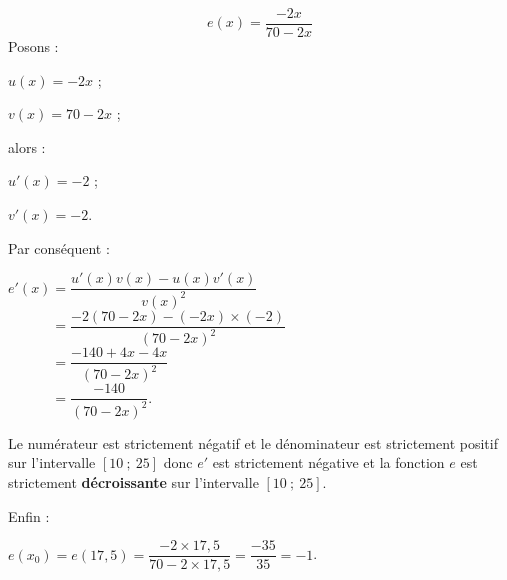 \begin{corrige}
\begin{enumerate}
          \[ e(x)=\dfrac{-2x}{70-2x} \]
          Posons :
          \par
          $u(x)=-2x$ ;
          \par
          $v(x)=70-2x$ ;
          \par
          alors :
          \par
          $u'(x)=-2$ ;
          \par
          $v'(x)=-2$.
          \par
          Par conséquent :
          \par
          $e'(x)= \dfrac{u'(x)v(x)-u(x)v'(x)}{v(x)^2}$\\
          $\phantom{e'(x)}=\dfrac{-2(70-2x)-(-2x) \times (-2)}{(70-2x)^2}$\\
          $\phantom{e'(x)}= \dfrac{-140+4x-4x}{(70-2x)^2}$\\
          $\phantom{e'(x)}= \dfrac{-140}{(70-2x)^2}.$
          \par
          Le numérateur est strictement négatif et le dénominateur est strictement positif sur l'intervalle $[10~;~25]$ donc $e'$ est strictement négative et la fonction $e$ est strictement \textbf{décroissante} sur l'intervalle $[10~;~25]$.
          \par
          Enfin :
          \par
          $e(x_0)=e(17,5)=\dfrac{-2 \times 17,5}{70-2 \times 17,5}$\nosp$=\dfrac{-35}{35}=-1$.
          \par
     \end{enumerate}
\end{corrige}
